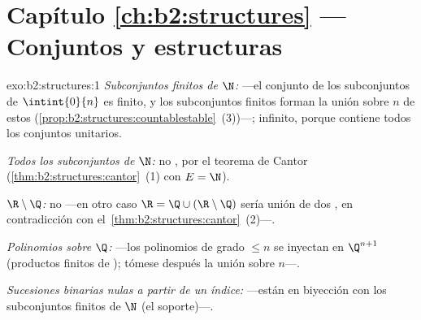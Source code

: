 \section*{Capítulo \ref{ch:b2:structures} --- Conjuntos y estructuras}

\begin{solution}{exo:b2:structures:1}
\emph{Subconjuntos finitos de $\N$:}  ---el conjunto de los
subconjuntos de $\intint{0}{n}$ es finito, y los subconjuntos finitos
forman la unión  sobre $n$ de estos
(\cref{prop:b2:structures:countablestable}~(3))---; infinito, porque
contiene todos los conjuntos unitarios.

\emph{Todos los subconjuntos de $\N$:} no , por el teorema de
Cantor (\cref{thm:b2:structures:cantor}~(1) con $E = \N$).

\emph{$\R \setminus \Q$:} no  ---en otro caso $\R = \Q \cup
(\R\setminus\Q)$ sería unión de dos , en
contradicción con el~\cref{thm:b2:structures:cantor}~(2)---.

\emph{Polinomios sobre $\Q$:}  ---los polinomios de grado
$\leq n$ se inyectan en $\Q^{n+1}$ (productos finitos de ); tómese después la unión sobre $n$---.

\emph{Sucesiones binarias nulas a partir de un índice:} 
---están en biyección con los subconjuntos finitos de $\N$ (el
soporte)---.
\end{solution}

